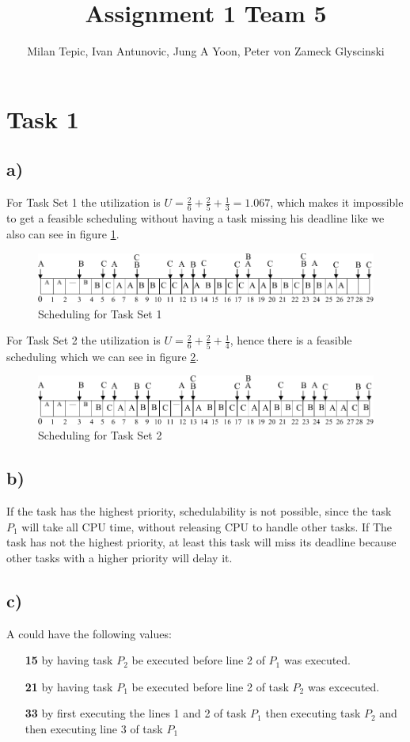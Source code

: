 \documentclass[10pt,a4paper]{article}
\author{Milan Tepic, Ivan Antunovic, Jung A Yoon, Peter von Zameck Glyscinski}
\title{Assignment 1 Team 5}
\begin{document}
\maketitle

\section*{Task 1}
\subsection*{a)}
For Task Set 1 the utilization is $U = \frac{2}{6} + \frac{2}{5} + \frac{1}{3} = 1.067$, which makes it impossible to get a feasible scheduling without having a task missing his deadline like we also can see in figure \ref{fig:timming-diagram1}. 
\begin{figure}[h]
\includegraphics[width=\linewidth]{timing-diagram1.pdf}
\caption{Scheduling for Task Set 1}
\label{fig:timming-diagram1}
\end{figure}

For Task Set 2 the utilization is $U = \frac{2}{6} + \frac{2}{5} + \frac{1}{4}$, hence there is a feasible scheduling which we can see in figure \ref{fig:timming-diagram2}.

\begin{figure}[h]
\includegraphics[width=\linewidth]{timing-diagram2.pdf}
\caption{Scheduling for Task Set 2}
\label{fig:timming-diagram2}
\end{figure}

\subsection*{b)}
If the task has the highest priority, schedulability is not possible, since the task $P_1$ will take all CPU time, without releasing CPU to handle other tasks.
\newline
If The task has not the highest priority, at least this task will miss its deadline because other tasks with a higher priority will delay it.
\subsection*{c)}
A could have the following values:
\begin{itemize}
\item[\textbf{15}] by having task $P_2$ be executed before line 2 of $P_1$ was executed.
\item[\textbf{21}] by having task $P_1$ be executed before line 2 of task $P_2$ was excecuted.
\item[\textbf{33}] by first executing the lines 1 and 2 of task $P_1$ then executing task $P_2$ and then executing line 3 of task $P_1$
\end{itemize}
\end{document}
